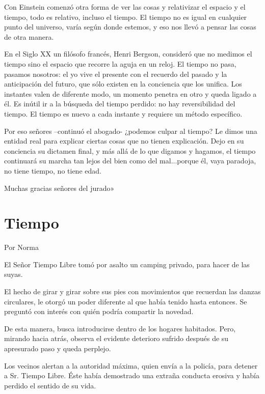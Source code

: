 \documentclass[11pt,twoside,openright,a5paper]{book}
\begin{document}
Con Einstein comenzó otra forma de ver las cosas y relativizar el espacio y el tiempo, todo es relativo, incluso el tiempo. El tiempo no es igual en cualquier punto del universo, varía según donde estemos, y eso nos llevó a pensar las cosas de otra manera. 

En el Siglo XX un filósofo francés, Henri Bergson, consideró que no medimos el tiempo sino el espacio que recorre la aguja en un reloj. El tiempo no pasa, pasamos nosotros: el yo vive el presente con el recuerdo del pasado y la anticipación del futuro, que sólo existen en la conciencia que los unifica. Los instantes valen de diferente modo, un momento penetra en otro y queda ligado a él. Es inútil ir a la búsqueda del tiempo perdido: no hay reversibilidad del tiempo. El tiempo es nuevo a cada instante y requiere un método específico.

Por eso señores –continuó el abogado- ¿podemos culpar al tiempo? Le dimos una entidad real para explicar ciertas cosas que no tienen explicación. Dejo en su conciencia su dictamen final, y más allá de lo que digamos y hagamos, el tiempo continuará su marcha tan lejos del bien como del mal...porque él, vaya paradoja, no tiene tiempo, no tiene edad.

Muchas gracias señores del jurado»
\clearpage
\section*{Tiempo}
                                                                                                         \begin{flushright}Por Norma\end{flushright}

El Señor Tiempo Libre tomó por asalto un camping privado, para hacer de las suyas.

El hecho de girar y girar sobre sus pies con movimientos que recuerdan las danzas circulares, le otorgó un poder diferente al que había tenido hasta entonces. Se preguntó con interés con quién podría compartir la novedad.

De esta manera, busca introducirse dentro de los hogares habitados. Pero, mirando hacia atrás, observa el evidente deterioro sufrido después de su apresurado paso y queda perplejo.

Los vecinos alertan a la autoridad máxima, quien envía a la policía, para detener a Sr. Tiempo Libre. Éste había demostrado una extraña conducta erosiva y había perdido el sentido de su vida.
\end{document}

